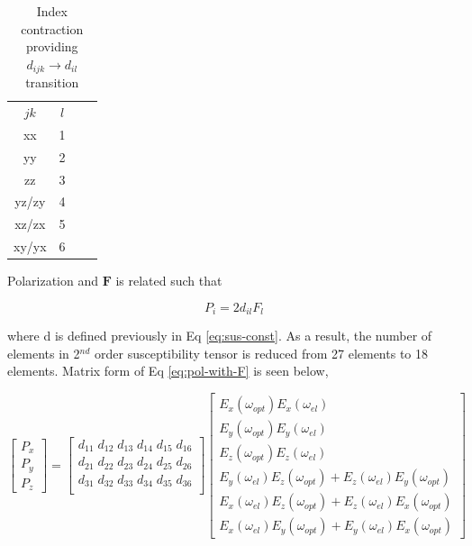 \documentclass[thesis]{deutez}
\begin{document}
    \begin{table}[h]
        \centering
        \begin{tabular}{|c|c|c|c}
            \cline{1-2}
            $jk$ & $l$ \\ \cline{1-2}
            xx   & 1       \\ \cline{1-2}
            yy   & 2     \\ \cline{1-2}
            zz   & 3    \\ \cline{1-2}
            yz/zy   & 4    \\ \cline{1-2}
            xz/zx   & 5    \\ \cline{1-2}
            xy/yx   & 6    \\ \cline{1-2}
        \end{tabular}
        \caption{Index contraction providing $d_{ijk} \rightarrow d_{il}$ transition}
        \label{tab:index-contraction}
    \end{table}

    Polarization and $\mathbf{F} $ is related such that

    \begin{equation}
        P_i = 2d_{il} F_l
        \label{eq:pol-with-F}
    \end{equation}
    
    where d is defined previously in Eq \ref{eq:sus-const}. As a result, the number of elements in 2$^{nd}$ order susceptibility tensor is reduced from 27 elements to 18 elements.  Matrix form of Eq \ref{eq:pol-with-F} is seen below,

    \begin{equation}
    \begin{bmatrix}
        P_x \\
        P_y \\
        P_z 
    \end{bmatrix}
    =
    \begin{bmatrix}
        d_{11} \; d_{12} \; d_{13} \; d_{14} \; d_{15} \; d_{16} \\
        d_{21} \; d_{22} \; d_{23} \; d_{24} \; d_{25} \; d_{26} \\
        d_{31} \; d_{32} \; d_{33} \; d_{34} \; d_{35} \; d_{36} \\
    \end{bmatrix}
    \begin{bmatrix}
        E_x(\omega_{opt})E_x(\omega_{el}) \\
        E_y(\omega_{opt})E_y(\omega_{el}) \\
        E_z(\omega_{opt})E_z(\omega_{el}) \\
        E_y(\omega_{el})E_z(\omega_{opt})+E_z(\omega_{el})E_y(\omega_{opt}) \\
        E_x(\omega_{el})E_z(\omega_{opt})+E_z(\omega_{el})E_x(\omega_{opt}) \\
        E_x(\omega_{el})E_y(\omega_{opt})+E_y(\omega_{el})E_x(\omega_{opt})
    \end{bmatrix}
    \label{eq:F_matrix_equation}
    \end{equation}
\end{document}
